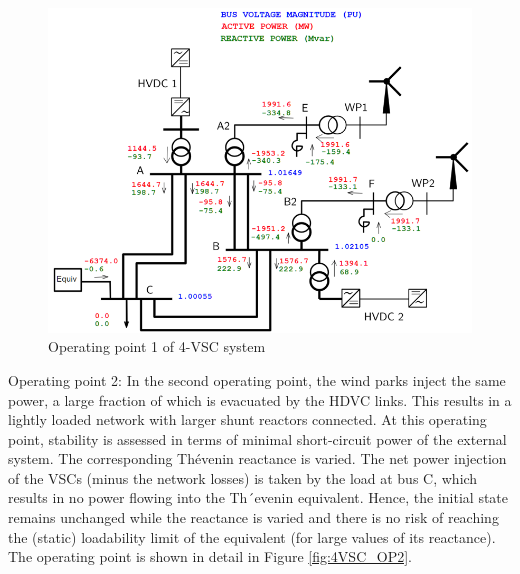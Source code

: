\documentclass{report}
\begin{document}

\begin{figure}[H]
    \centering
    \includegraphics[scale = 0.6]{Figure_4VSC/4VSC_OP1.PNG}
    \caption{Operating point 1 of 4-VSC system}
    \label{fig:4VSC_OP1}
\end{figure}

Operating point 2:
In the second operating point, the wind parks inject the same power, a large fraction of which is evacuated by the HDVC links. This results in a lightly loaded network with larger shunt reactors connected. At this operating point, stability is assessed in terms of minimal short-circuit power of the external system. The corresponding Thévenin reactance is varied. The net power injection of the VSCs (minus the network losses) is taken by the load at bus C, which results in no power flowing into the Th´evenin equivalent. Hence, the initial state remains unchanged while the reactance is varied and there is no risk of reaching the (static) loadability limit of the equivalent (for large values of its reactance). The operating point is shown in detail in Figure \ref{fig:4VSC_OP2}.
\end{document}

